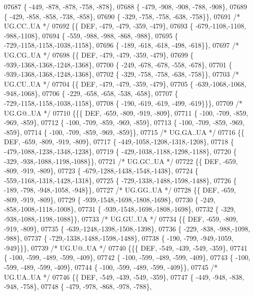 \begin{DoxyCode}
07687 \{ -449, -878, -878, -758, -878\},
07688 \{ -479, -908, -908, -788, -908\},
07689 \{ -429, -858, -858, -738, -858\},
07690 \{ -329, -758, -758, -638, -758\}\},
07691 \textcolor{comment}{/* UG.CC..UA */}
07692 \{\{  DEF, -479, -479, -359, -479\},
07693 \{ -679,-1108,-1108, -988,-1108\},
07694 \{ -559, -988, -988, -868, -988\},
07695 \{ -729,-1158,-1158,-1038,-1158\},
07696 \{ -189, -618, -618, -498, -618\}\},
07697 \textcolor{comment}{/* UG.CG..UA */}
07698 \{\{  DEF, -479, -479, -359, -479\},
07699 \{ -939,-1368,-1368,-1248,-1368\},
07700 \{ -249, -678, -678, -558, -678\},
07701 \{ -939,-1368,-1368,-1248,-1368\},
07702 \{ -329, -758, -758, -638, -758\}\},
07703 \textcolor{comment}{/* UG.CU..UA */}
07704 \{\{  DEF, -479, -479, -359, -479\},
07705 \{ -639,-1068,-1068, -948,-1068\},
07706 \{ -229, -658, -658, -538, -658\},
07707 \{ -729,-1158,-1158,-1038,-1158\},
07708 \{ -190, -619, -619, -499, -619\}\}\},
07709 \textcolor{comment}{/* UG.G@..UA */}
07710 \{\{\{  DEF, -659, -809, -919, -809\},
07711 \{ -100, -709, -859, -969, -859\},
07712 \{ -100, -709, -859, -969, -859\},
07713 \{ -100, -709, -859, -969, -859\},
07714 \{ -100, -709, -859, -969, -859\}\},
07715 \textcolor{comment}{/* UG.GA..UA */}
07716 \{\{  DEF, -659, -809, -919, -809\},
07717 \{ -449,-1058,-1208,-1318,-1208\},
07718 \{ -479,-1088,-1238,-1348,-1238\},
07719 \{ -429,-1038,-1188,-1298,-1188\},
07720 \{ -329, -938,-1088,-1198,-1088\}\},
07721 \textcolor{comment}{/* UG.GC..UA */}
07722 \{\{  DEF, -659, -809, -919, -809\},
07723 \{ -679,-1288,-1438,-1548,-1438\},
07724 \{ -559,-1168,-1318,-1428,-1318\},
07725 \{ -729,-1338,-1488,-1598,-1488\},
07726 \{ -189, -798, -948,-1058, -948\}\},
07727 \textcolor{comment}{/* UG.GG..UA */}
07728 \{\{  DEF, -659, -809, -919, -809\},
07729 \{ -939,-1548,-1698,-1808,-1698\},
07730 \{ -249, -858,-1008,-1118,-1008\},
07731 \{ -939,-1548,-1698,-1808,-1698\},
07732 \{ -329, -938,-1088,-1198,-1088\}\},
07733 \textcolor{comment}{/* UG.GU..UA */}
07734 \{\{  DEF, -659, -809, -919, -809\},
07735 \{ -639,-1248,-1398,-1508,-1398\},
07736 \{ -229, -838, -988,-1098, -988\},
07737 \{ -729,-1338,-1488,-1598,-1488\},
07738 \{ -190, -799, -949,-1059, -949\}\}\},
07739 \textcolor{comment}{/* UG.U@..UA */}
07740 \{\{\{  DEF, -549, -439, -549, -359\},
07741 \{ -100, -599, -489, -599, -409\},
07742 \{ -100, -599, -489, -599, -409\},
07743 \{ -100, -599, -489, -599, -409\},
07744 \{ -100, -599, -489, -599, -409\}\},
07745 \textcolor{comment}{/* UG.UA..UA */}
07746 \{\{  DEF, -549, -439, -549, -359\},
07747 \{ -449, -948, -838, -948, -758\},
07748 \{ -479, -978, -868, -978, -788\},

\end{DoxyCode}
